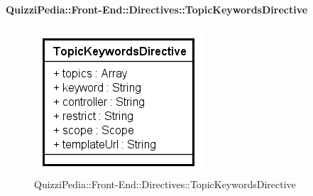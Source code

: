 \paragraph{QuizziPedia::Front-End::Directives::TopicKeywordsDirective}

\label{QuizziPedia::Front-End::Directives::TopicKeywordsDirective}

\begin{figure}[h]
	\centering
	\includegraphics[scale=0.80,keepaspectratio]{UML/Classi/Front-End/QuizziPedia_Front-end_Directives_TopicKeywordsDirective.png}
	\caption{QuizziPedia::Front-End::Directives::TopicKeywordsDirective}
\end{figure}

